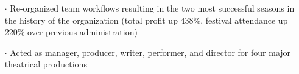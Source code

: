 \documentclass[a4paper, oneside, final]{scrartcl} %
\newcommand{\gray}{\rowcolor[gray]{.90}} %
\begin{document}
\begin{center}
\begin{itemize}
    \item[$\cdot$] Re-organized team workflows resulting in the two most successful seasons in the history of the organization (total profit up 438\%, festival attendance up 220\% over previous administration)\\
    \item[$\cdot$] Acted as manager, producer, writer, performer, and director for four major theatrical productions
  \end{itemize}

  \vspace{-0.05 cm}




\end{center}
\end{document}
